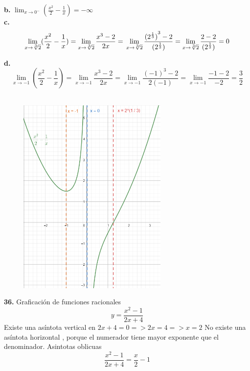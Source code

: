 \documentclass[12pt, letterpaper]{article}
\begin{document}
\textbf{b. } $\lim_{ x \to 0^-} (\frac{x^2}{2}-\frac{1}{x}) =  -\infty$\\

\textbf{c. } 
$$\lim_{ x \to \sqrt[3]{2}} (\frac{x^2}{2}-\frac{1}{x}) = \lim_{ x \to \sqrt[3]{2}} \frac{x^3-2}{2x} = \\
 \lim_{ x \to \sqrt[3]{2}}  \frac{{(2^{\frac{1}{3}})}^3 -2}{(2^{\frac{1}{3}})} = \lim_{ x \to \sqrt[3]{2}} \frac{2 - 2}{(2^{\frac{1}{3}})} = 0 $$

\textbf{d. } 
$$\lim_{ x \to -1} (\frac{x^2}{2}-\frac{1}{x}) = \lim_{ x \to -1} \frac{x^3-2}{2x} =\lim_{ x \to -1} \frac{(-1)^3-2}{2(-1)} = \lim_{ x \to -1} \frac{-1-2}{-2} =
\frac{3}{2}$$\\

\begin{figure}[tbh]
\centering
\includegraphics[width=20em]{t12dos}
\end{figure}

\newpage

\textbf{36.} Graficación de funciones racionales\\

 $$y= \frac{x^2 -1}{2x+4}$$
Existe una asíntota vertical en $2x+4= 0 => 2x=4 => x = 2$
No existe una asíntota horizontal , porque el numerador tiene mayor exponente que el denominador.
Asintotas oblicuas $$\frac{x^2-1}{2x+4}= \frac{x}{2}-1$$
\end{document}
